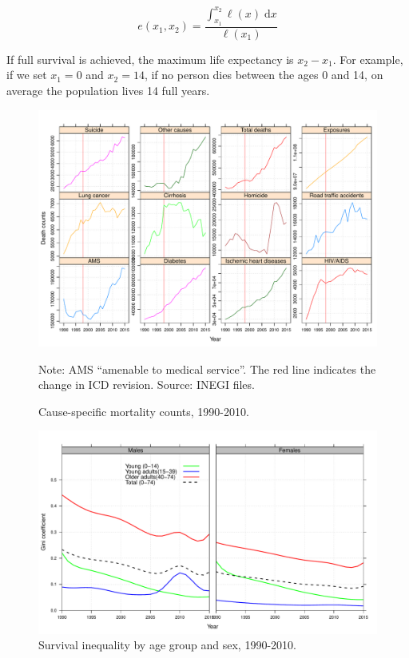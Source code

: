 \documentclass[11.5pt]{article}
\newcommand{\dd}{\; \mathrm{d}}
\begin{document}
{\begin{equation}
e(x_1,x_2) = \frac{\int _{x_1}^{x_2} \ell(x) \dd x}{\ell(x_1)}
\end{equation}

If full survival is achieved, the maximum life expectancy is $x_2-x_1$.  For example, if we set $x_1=0$ and $x_2=14$, if no person dies between the ages 0 and 14, on average the population lives 14 full years.



\begin{figure}
\centering
\caption{Cause-specific mortality counts, 1990-2010.}
\label{fig:ClassSens}
\includegraphics[scale=.6]{Sensitivity_fig.pdf}

Note: AMS ``amenable to medical service''. The red line indicates the change in ICD revision. Source: INEGI files. 
\end{figure}

\begin{figure}[h!]
\centering
\caption{Survival inequality by age group and sex, 1990-2010.}
\label{fig:Gini}
\includegraphics[scale=.5]{Gini_fig.pdf}


\end{figure}}
\end{document}
